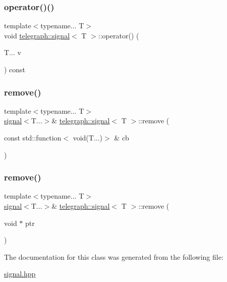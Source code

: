 \subsubsection{\texorpdfstring{operator()()}{operator()()}}
{\footnotesize\ttfamily template$<$typename... T$>$ \\
void \hyperlink{classtelegraph_1_1signal}{telegraph\+::signal}$<$ T $>$\+::operator() (\begin{DoxyParamCaption}\item[{T...}]{v }\end{DoxyParamCaption}) const\hspace{0.3cm}{\ttfamily [inline]}}

\mbox{\label{classtelegraph_1_1signal_a2adad7eecd9f66137706625a08441968}} 
\subsubsection{\texorpdfstring{remove()}{remove()}\hspace{0.1cm}{\footnotesize\ttfamily [1/2]}}
{\footnotesize\ttfamily template$<$typename... T$>$ \\
\hyperlink{classtelegraph_1_1signal}{signal}$<$T...$>$\& \hyperlink{classtelegraph_1_1signal}{telegraph\+::signal}$<$ T $>$\+::remove (\begin{DoxyParamCaption}\item[{const std\+::function$<$ void(T...)$>$ \&}]{cb }\end{DoxyParamCaption})\hspace{0.3cm}{\ttfamily [inline]}}

\mbox{\label{classtelegraph_1_1signal_a50b41c05f04a2788e92cc51ff311d302}} 
\subsubsection{\texorpdfstring{remove()}{remove()}\hspace{0.1cm}{\footnotesize\ttfamily [2/2]}}
{\footnotesize\ttfamily template$<$typename... T$>$ \\
\hyperlink{classtelegraph_1_1signal}{signal}$<$T...$>$\& \hyperlink{classtelegraph_1_1signal}{telegraph\+::signal}$<$ T $>$\+::remove (\begin{DoxyParamCaption}\item[{void $\ast$}]{ptr }\end{DoxyParamCaption})\hspace{0.3cm}{\ttfamily [inline]}}



The documentation for this class was generated from the following file\+:\begin{DoxyCompactItemize}
\item 
\hyperlink{signal_8hpp}{signal.\+hpp}\end{DoxyCompactItemize}
